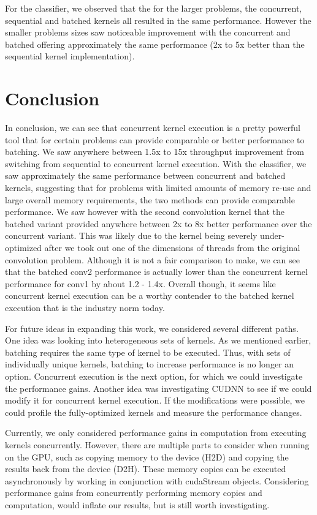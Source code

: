 \documentclass[sigconf]{acmart}
\begin{document}
For the classifier, we observed that the for the larger problems, the concurrent, sequential and batched kernels all resulted in the same performance. However the smaller problems sizes saw noticeable improvement with the concurrent and batched offering approximately the same performance (2x to 5x better than the sequential kernel implementation).

\section{Conclusion}
In conclusion, we can see that concurrent kernel execution is a pretty powerful tool that for certain problems can provide comparable or better performance to batching. We saw anywhere between 1.5x to 15x throughput improvement from switching from sequential to concurrent kernel execution. With the classifier, we saw approximately the same performance between concurrent and batched kernels, suggesting that for problems with limited amounts of memory re-use and large overall memory requirements, the two methods can provide comparable performance. We saw however with the second convolution kernel that the batched variant provided anywhere between 2x to 8x better performance over the concurrent variant. This was likely due to the kernel being severely under-optimized after we took out one of the dimensions of threads from the original convolution problem. Although it is not a fair comparison to make, we can see that the batched conv2 performance is actually lower than the concurrent kernel performance for conv1 by about 1.2 - 1.4x. Overall though, it seems like concurrent kernel execution can be a worthy contender to the batched kernel execution that is the industry norm today. 

For future ideas in expanding this work, we considered several different paths. One idea was looking into heterogeneous sets of kernels. As we mentioned earlier, batching requires the same type of kernel to be executed. Thus, with sets of individually unique kernels, batching to increase performance is no longer an option. Concurrent execution is the next option, for which we could investigate the performance gains. Another idea was investigating CUDNN to see if we could modify it for concurrent kernel execution. If the modifications were possible, we could profile the fully-optimized kernels and measure the performance changes.
  
Currently, we only considered performance gains in computation from executing kernels concurrently. However, there are multiple parts to consider when running on the GPU, such as copying memory to the device (H2D) and copying the results back from the device (D2H). These memory copies can be executed asynchronously by working in conjunction with cudaStream objects. Considering performance gains from concurrently performing memory copies and computation, would inflate our results, but is still worth investigating.
\end{document}
